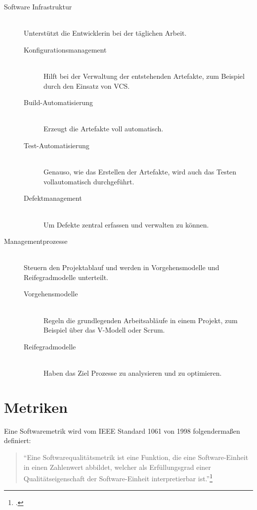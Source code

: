 \begin{description}
  \item[Software Infrastruktur] \hfill \\ Unterstützt die Entwicklerin bei der täglichen Arbeit.
  \begin{description}
    \item[Konfigurationsmanagement] \hfill \\ Hilft bei der Verwaltung der entstehenden Artefakte, zum Beispiel durch den Einsatz von \ac{VCS}.
    \item[Build-Automatisierung] \hfill \\ Erzeugt die Artefakte voll automatisch.
    \item[Test-Automatisierung] \hfill \\ Genauso, wie das Erstellen der Artefakte, wird auch das Testen vollautomatisch durchgeführt.
    \item[Defektmanagement] \hfill \\ Um Defekte zentral erfassen und verwalten zu können.
  \end{description}
  \item[Managementprozesse] \hfill \\ Steuern den Projektablauf und werden in Vorgehensmodelle und Reifegradmodelle unterteilt.
  \begin{description}
    \item[Vorgehensmodelle] \hfill \\ Regeln die grundlegenden Arbeitsabläufe in einem Projekt, zum Beispiel über das V-Modell oder Scrum.
    \item[Reifegradmodelle] \hfill \\ Haben das Ziel Prozesse zu analysieren und zu optimieren.
  \end{description}
\end{description}

\clearpage
\section{Metriken}

Eine Softwaremetrik wird vom \ac{IEEE} Standard 1061 von 1998 folgendermaßen definiert:
\begin{quote}
  ``Eine Softwarequalitätsmetrik ist eine Funktion, die eine Software-Einheit in einen Zahlenwert abbildet, welcher als Erfüllungsgrad einer Qualitätseigenschaft der Software-Einheit interpretierbar ist.''\footcite[vgl.][S.3]{ieee-1061}
\end{quote}

